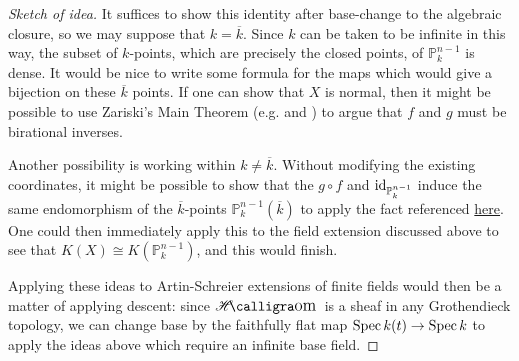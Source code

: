 \documentclass[letterpaper, openany, 10pt]{article}
\begin{document}
\begin{proof}[Sketch of idea]
	It suffices to show this identity after base-change to the algebraic closure, so we may suppose that $k = \overline{k}$. Since $k$ can be taken to be infinite in this way, the subset of $k$-points, which are precisely the closed points, of $\mathbb{P}_k^{n-1}$ is dense. It would be nice to write some formula for the maps which would give a bijection on these $\overline{k}$ points. If one can show that $X$ is normal, then it might be possible to use Zariski's Main Theorem (e.g.\cite[\href{https://stacks.math.columbia.edu/tag/03GW}{Lemma 03GW}]{stacks-project} and \cite{264216}) to argue that $f$ and $g$ must be birational inverses. 

	Another possibility is working within $k \neq \overline{k}$. Without modifying the existing coordinates, it might be possible to show that the $g \circ f$ and $\operatorname{id}_{\mathbb{P}_k^{n-1}}$ induce the same endomorphism of the $\overline{k}$-points $\mathbb{P}_k^{n-1}(\overline{k})$ to apply the fact referenced \href{https://math.stackexchange.com/q/630465}{here}. One could then immediately apply this to the field extension discussed above to see that $K(X) \cong K(\mathbb{P}_k^{n-1})$, and this would finish.

	Applying these ideas to Artin-Schreier extensions of finite fields would then be a matter of applying descent: since $\SheafHom$ is a sheaf in any Grothendieck topology, we can change base by the faithfully flat map $\operatorname{Spec} k(t) \to \operatorname{Spec} k$ to apply the ideas above which require an infinite base field.
\end{proof}



\end{document}
